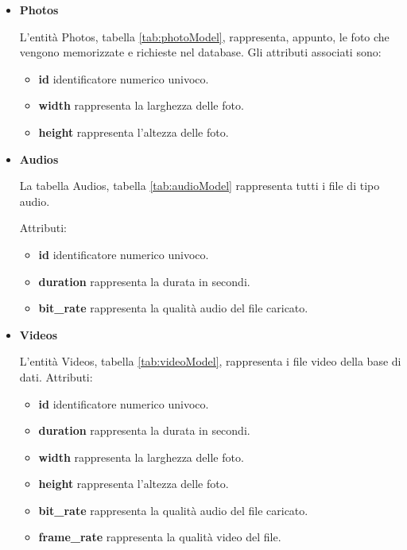 \pagebreak

\begin{itemize}
	\item \textbf{Photos}
	
		L'entità Photos, tabella \ref{tab:photoModel}, rappresenta, appunto, le foto che vengono memorizzate e richieste nel database. Gli attributi associati sono:
		
		\begin{itemize}
			\item \textbf{id} identificatore numerico univoco.
			\item \textbf{width} rappresenta la larghezza delle foto.
			\item \textbf{height} rappresenta l'altezza delle foto.
		\end{itemize}
	
	\item \textbf{Audios}
	
		La tabella Audios, tabella \ref{tab:audioModel} rappresenta tutti i file di tipo audio. 
		
		Attributi:
		
		\begin{itemize}
			\item \textbf{id} identificatore numerico univoco.
			\item \textbf{duration} rappresenta la durata in secondi.
			\item \textbf{bit\_rate} rappresenta la qualità audio del file caricato.
		\end{itemize}
		
	\item \textbf{Videos}
	
		L'entità Videos, tabella \ref{tab:videoModel}, rappresenta i file video della base di dati.
		Attributi:
		
		\begin{itemize}
			\item \textbf{id} identificatore numerico univoco.
			\item \textbf{duration} rappresenta la durata in secondi.
			\item \textbf{width} rappresenta la larghezza delle foto.
			\item \textbf{height} rappresenta l'altezza delle foto.
			\item \textbf{bit\_rate} rappresenta la qualità audio del file caricato.
			\item \textbf{frame\_rate} rappresenta la qualità video del file.
		\end{itemize}
	

\end{itemize}
